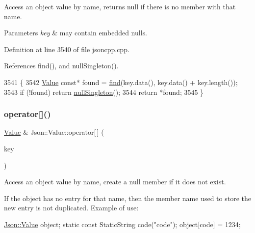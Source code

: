 Access an object value by name, returns null if there is no member with that name. 
\begin{DoxyParams}{Parameters}
{\em key} & may contain embedded nulls. \\
\hline
\end{DoxyParams}


Definition at line 3540 of file jsoncpp.\+cpp.



References find(), and null\+Singleton().


\begin{DoxyCode}
3541 \{
3542   \hyperlink{class_json_1_1_value_ada6ba1369448fb0240bccc36efaa46f7}{Value} \textcolor{keyword}{const}* found = \hyperlink{class_json_1_1_value_afb007b9ce9b2cf9d5f667a07e5e0349f}{find}(key.data(), key.data() + key.length());
3543   \textcolor{keywordflow}{if} (!found) \textcolor{keywordflow}{return} \hyperlink{class_json_1_1_value_af2f124567acc35d021a424e53ebdfcab}{nullSingleton}();
3544   \textcolor{keywordflow}{return} *found;
3545 \}
\end{DoxyCode}
\mbox{\label{class_json_1_1_value_ac3763d7d315ca65dc188e273722f7955}} 
\subsubsection{\texorpdfstring{operator[]()}{operator[]()}\hspace{0.1cm}{\footnotesize\ttfamily [9/9]}}
{\footnotesize\ttfamily \hyperlink{class_json_1_1_value}{Value} \& Json\+::\+Value\+::operator\mbox{[}$\,$\mbox{]} (\begin{DoxyParamCaption}\item[{const \hyperlink{class_json_1_1_static_string}{Static\+String} \&}]{key }\end{DoxyParamCaption})}



Access an object value by name, create a null member if it does not exist. 

If the object has no entry for that name, then the member name used to store the new entry is not duplicated. Example of use\+: 
\begin{DoxyCode}
\hyperlink{class_json_1_1_value}{Json::Value} object;
\textcolor{keyword}{static} \textcolor{keyword}{const} StaticString code(\textcolor{stringliteral}{"code"});
\textcolor{keywordtype}{object}[code] = 1234;
\end{DoxyCode}
 

